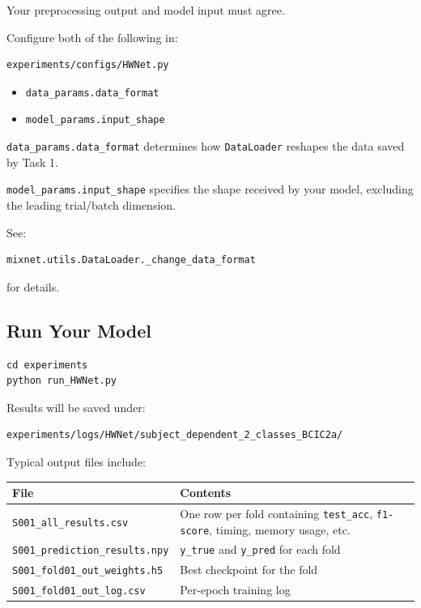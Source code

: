 \documentclass[
  10pt,
]{article}
\newcounter{none} %
\begin{document}
Your preprocessing output and model input must agree.

Configure both of the following in:

\begin{verbatim}
experiments/configs/HWNet.py
\end{verbatim}

\begin{itemize}
\item
  \texttt{data\_params.data\_format}
\item
  \texttt{model\_params.input\_shape}
\end{itemize}

\texttt{data\_params.data\_format} determines how \texttt{DataLoader}
reshapes the data saved by Task 1.

\texttt{model\_params.input\_shape} specifies the shape received by
your model, excluding the leading trial/batch dimension.

See:

\begin{verbatim}
mixnet.utils.DataLoader._change_data_format
\end{verbatim}

for details.

\subsection{Run Your Model}\label{run-your-model}

\begin{verbatim}
cd experiments
python run_HWNet.py
\end{verbatim}

Results will be saved under:

\begin{verbatim}
experiments/logs/HWNet/subject_dependent_2_classes_BCIC2a/
\end{verbatim}

Typical output files include:

{\def\LTcaptype{none} %
\begin{longtable}[]{@{}
  >{\raggedright\arraybackslash}p{}
  >{\raggedright\arraybackslash}p{}@{}}
\toprule\noalign{}
\begin{minipage}[b]{\linewidth}\raggedright
File
\end{minipage} & \begin{minipage}[b]{\linewidth}\raggedright
Contents
\end{minipage} \\
\midrule\noalign{}
\endhead
\bottomrule\noalign{}
\endlastfoot
\texttt{S001\_all\_results.csv} & One row per fold containing
\texttt{test\_acc}, \texttt{f1-score}, timing, memory usage, etc. \\
\texttt{S001\_prediction\_results.npy} & \texttt{y\_true} and
\texttt{y\_pred} for each fold \\
\texttt{S001\_fold01\_out\_weights.h5} & Best checkpoint for the
fold \\
\texttt{S001\_fold01\_out\_log.csv} & Per-epoch training log \\
\end{longtable}
}
\end{document}

